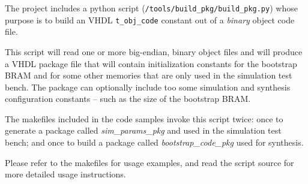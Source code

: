     The project includes a python script (\texttt{/tools/build\_pkg/build\_pkg.py}) 
    whose purpose is to build an VHDL \texttt{t\_obj\_code} constant out of a 
    \emph{binary} object code file. 
       
    This script will read one or more big-endian, binary object files and will 
    produce a  VHDL package file that will contain initialization constants for 
    the bootstrap BRAM and for some other memories that are only used in the 
    simulation test bench.
    The package can optionally include too some simulation and synthesis 
    configuration constants -- such as the size of the bootstrap BRAM.
    
    The makefiles included in the code samples invoke this script twice: once
    to generate a package called \emph{sim\_params\_pkg} and used in the 
    simulation test bench; and once to build a package called 
    \emph{bootstrap\_code\_pkg} used for synthesis.
    
    Please refer to the makefiles for usage examples, and read the script source
    for more detailed usage instructions.
    
    